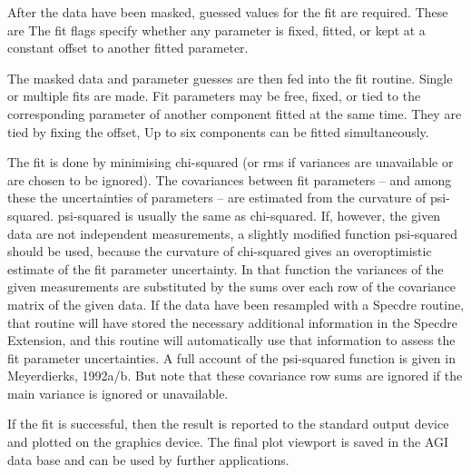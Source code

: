 {{      After the data have been masked, guessed values for the fit are
      required. These are
      The fit flags specify whether any parameter is fixed, fitted, or
      kept at a constant offset to another fitted parameter.

      The masked data and parameter guesses are then fed into the fit
      routine. Single or multiple fits are made. Fit parameters may be
      free, fixed, or tied to the corresponding parameter of another
      component fitted at the same time. They are tied by fixing the
      offset, Up to six components can be fitted simultaneously.

      The fit is done by minimising chi-squared (or rms if variances are
      unavailable or are chosen to be ignored). The covariances between
      fit parameters -- and among these the uncertainties of parameters --
      are estimated from the curvature of psi-squared. psi-squared is
      usually the same as chi-squared. If, however, the given data are
      not independent measurements, a slightly modified function
      psi-squared should be used, because the curvature of chi-squared
      gives an overoptimistic estimate of the fit parameter uncertainty.
      In that function the variances of the given measurements are
      substituted by the sums over each row of the covariance matrix of
      the given data. If the data have been resampled with a Specdre
      routine, that routine will have stored the necessary additional
      information in the Specdre Extension, and this routine will
      automatically use that information to assess the fit parameter
      uncertainties. A full account of the psi-squared function is given
      in Meyerdierks, 1992a/b. But note that these covariance row sums
      are ignored if the main variance is ignored or unavailable.

      If the fit is successful, then the result is reported to
      the standard output device and plotted on the graphics device. The
      final plot viewport is saved in the AGI data base and can be used
      by further applications.

}}
